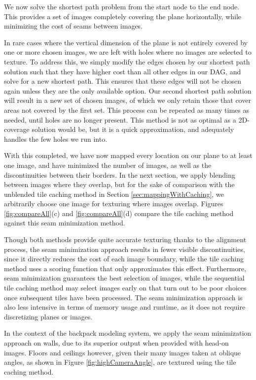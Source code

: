 \documentclass[10pt,twocolumn,letterpaper]{article}
\begin{document}
We now solve the shortest path problem from the start node to the end
node. This provides a set of images completely covering the plane
horizontally, while minimizing the cost of seams between images.

In rare cases where the vertical dimension of the plane is not
entirely covered by one or more chosen images, we are left with holes
where no images are selected to texture. To address this, we simply
modify the edges chosen by our shortest path solution such that they
have higher cost than all other edges in our DAG, and solve for a new
shortest path. This ensures that these edges will not be chosen again
unless they are the only available option. Our second shortest path
solution will result in a new set of chosen images, of which we only
retain those that cover areas not covered by the first set. This
process can be repeated as many times as needed, until holes are no
longer present. This method is not as optimal as a 2D-coverage
solution would be, but it is a quick approximation, and adequately
handles the few holes we run into.

With this completed, we have now mapped every location on our plane to
at least one image, and have minimized the number of images, as well
as the discontinuities between their borders. In the next section, we
apply blending between images where they overlap, but for the sake of
comparison with the unblended tile caching method in Section
\ref{sec:mappingWithCaching}, we arbitrarily choose one image for
texturing where images overlap. Figures \ref{fig:compareAll}(c) and \ref{fig:compareAll}(d)
compare the tile caching method against this seam minimization
method.

Though both methods provide quite accurate texturing thanks to the
alignment process, the seam minimization approach results in fewer
visible discontinuities, since it directly reduces the cost of each
image boundary, while the tile caching method uses a scoring function
that only approximates this effect. Furthermore, seam minimization
guarantees the best selection of images, while the sequential tile
caching method may select images early on that turn out to be poor
choices once subsequent tiles have been processed. The seam minimization approach is also less intensive in terms of memory usage and runtime, as it does not require discretizing planes or images. 

In the context of the backpack modeling system, we apply the seam
minimization approach on walls, due to its superior output when
provided with head-on images. Floors and ceilings however, given their
many images taken at oblique angles, as shown in Figure
\ref{fig:highCameraAngle}, are textured using the tile caching method.
\end{document}
